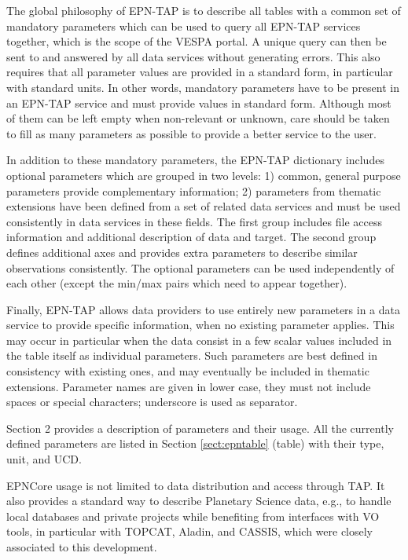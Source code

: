 \documentclass[11pt,a4paper]{ivoa}
\begin{document}
The global philosophy of EPN-TAP is to describe all tables with a common
set of mandatory parameters which can be used to query all EPN-TAP
services together, which is the scope of the VESPA portal. A unique query
can then be sent to and answered by all data services without generating
errors. This also requires that all parameter values are provided in
a standard form, in particular with standard units. In other words,
mandatory parameters have to be present in an EPN-TAP service and must
provide values in standard form. Although most of them can be left
empty when non-relevant or unknown, care should be taken to fill as many
parameters as possible to provide a better service to the user.

In addition to these mandatory parameters, the EPN-TAP dictionary includes
optional parameters which are grouped in two levels: 1) common, general
purpose parameters provide complementary information; 2) parameters from
thematic extensions have been defined from a set of related data services
and must be used consistently in data services in these fields. The first
group includes file access information and additional description of data
and target. The second group defines additional axes and provides extra
parameters to describe similar observations consistently. The optional
parameters can be used independently of each other
(except the min/max pairs which need to appear together).

Finally, EPN-TAP allows data providers to use entirely new parameters in a
data service to provide specific information, when no existing parameter
applies. This may occur in particular when the data consist in a few
scalar values included in the table itself as individual parameters. Such
parameters are best defined in consistency with existing ones, and may
eventually be included in thematic extensions.
Parameter names are given in lower case, they must not include spaces
or special characters; underscore is used as separator.

Section 2 provides a description of parameters and their usage. All the
currently defined parameters are listed in Section \ref{sect:epntable}
(table) with their
type, unit, and UCD.

EPNCore usage is not limited to data distribution and access through
TAP. It also provides a standard way to describe Planetary Science data,
e.g., to handle local databases and private projects while benefiting
from interfaces with VO tools, in particular with TOPCAT, Aladin, and
CASSIS, which were closely associated to this development.
\end{document}
